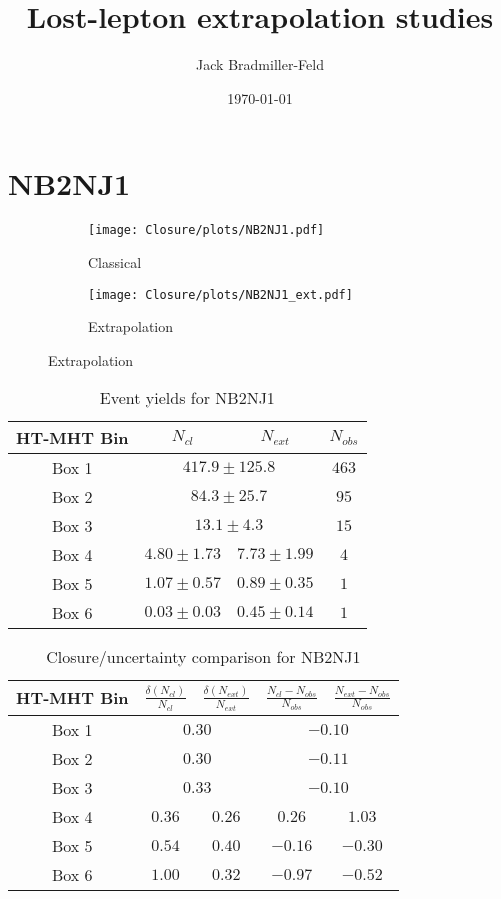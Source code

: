 \documentclass[11pt, oneside]{article}
\title{Lost-lepton extrapolation studies}
\author{Jack Bradmiller-Feld}
\date{\today}
\begin{document}
\maketitle

\section{NB2NJ1}

\begin{figure}[h]
\centering
\caption{NB2NJ1}
\begin{subfigure}[b]{0.49\textwidth}
\texttt{[image: Closure/plots/NB2NJ1.pdf]}
\caption{Classical}
\end{subfigure}
\begin{subfigure}[b]{0.49\textwidth}
\texttt{[image: Closure/plots/NB2NJ1\_ext.pdf]}
\caption{Extrapolation}
\end{subfigure}
\end{figure}


\begin{table}[h]
\centering
\caption{Event yields for NB2NJ1}
\begin{tabular}{|c|c|c|c|}
\hline
HT-MHT Bin & $N_{cl}$ & $N_{ext}$ & $N_{obs}$ \\
\hline
Box 1 & \multicolumn{2}{c|}{$417.9\pm125.8$} & $463$ \\ 
Box 2 & \multicolumn{2}{c|}{$84.3\pm25.7$} & $ 95$ \\ 
Box 3 & \multicolumn{2}{c|}{$13.1\pm4.3$} & $ 15$ \\ 
\hline 
Box 4 & $4.80\pm1.73$ & $7.73\pm1.99$ & $  4$ \\ 
Box 5 & $1.07\pm0.57$ & $0.89\pm0.35$ & $  1$ \\ 
Box 6 & $0.03\pm0.03$ & $0.45\pm0.14$ & $  1$ \\ 
\hline
\end{tabular}
\end{table}


\begin{table}[h]
\centering
\caption{Closure/uncertainty comparison for NB2NJ1}
\begin{tabular}{|c|c|c|c|c|}
\hline
HT-MHT Bin & $\frac{\delta(N_{cl})}{N_{cl}}$ & $\frac{\delta(N_{ext})}{N_{ext}}$ & $\frac{N_{cl}-N_{obs}}{N_{obs}}$ &  $\frac{N_{ext}-N_{obs}}{N_{obs}}$ \\
\hline
Box 1 & \multicolumn{2}{c|}{$0.30$} & \multicolumn{2}{c|}{$-0.10$} \\ 
Box 2 & \multicolumn{2}{c|}{$0.30$} & \multicolumn{2}{c|}{$-0.11$} \\ 
Box 3 & \multicolumn{2}{c|}{$0.33$} & \multicolumn{2}{c|}{$-0.10$} \\ 
\hline 
Box 4 & $0.36$ & $0.26$ & $0.26$ & $1.03$ \\ 
Box 5 & $0.54$ & $0.40$ & $-0.16$ & $-0.30$ \\ 
Box 6 & $1.00$ & $0.32$ & $-0.97$ & $-0.52$ \\ 
\hline
\end{tabular}
\end{table}
\end{document}
